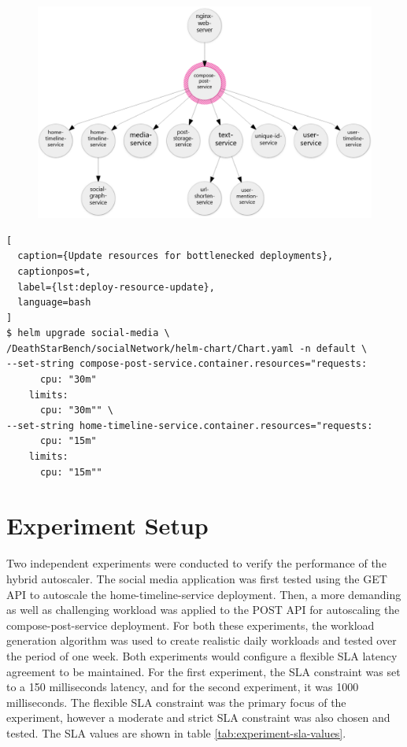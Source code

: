 \begin{figure}[htb]
\begin{minipage}{0.75\linewidth}
        \includegraphics[width=1.0\linewidth]{Figures/Compose-Post-POST-Trace.png}
    \end{minipage}
\end{figure}

\begin{lstlisting}[
  caption={Update resources for bottlenecked deployments},
  captionpos=t,
  label={lst:deploy-resource-update},
  language=bash
]
$ helm upgrade social-media \
/DeathStarBench/socialNetwork/helm-chart/Chart.yaml -n default \
--set-string compose-post-service.container.resources="requests: 
      cpu: "30m"
    limits:
      cpu: "30m"" \
--set-string home-timeline-service.container.resources="requests: 
      cpu: "15m"
    limits:
      cpu: "15m""
\end{lstlisting}

\section{Experiment Setup}
\label{sec:ch5-exp-setup}

Two independent experiments were conducted to verify the performance of the hybrid autoscaler. The social media application was first tested using the GET API to autoscale the home-timeline-service deployment. Then, a more demanding as well as challenging workload was applied to the POST API for autoscaling the compose-post-service deployment. For both these experiments, the workload generation algorithm was used to create realistic daily workloads and tested over the period of one week. Both experiments would configure a flexible SLA latency agreement to be maintained. For the first experiment, the SLA constraint was set to a 150 milliseconds latency, and for the second experiment, it was 1000 milliseconds. The flexible SLA constraint was the primary focus of the experiment, however a moderate and strict SLA constraint was also chosen and tested. The SLA values are shown in table \ref{tab:experiment-sla-values}.\par

